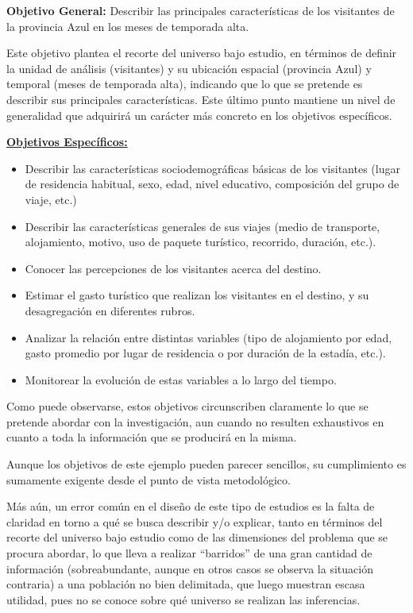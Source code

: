 \documentclass[
]{book}
\begin{document}
\textbf{Objetivo General:} Describir las principales características de los visitantes de la provincia Azul en los meses de temporada alta.

Este objetivo plantea el recorte del universo bajo estudio, en términos de definir la unidad de análisis (visitantes) y su ubicación espacial (provincia Azul) y temporal (meses de temporada alta), indicando que lo que se pretende es describir sus principales características. Este último punto mantiene un nivel de generalidad que adquirirá un carácter más concreto en los objetivos específicos.

\underline{\textbf{Objetivos Específicos:}}

\begin{itemize}
\item
  Describir las características sociodemográficas básicas de los visitantes (lugar de residencia habitual, sexo, edad, nivel educativo, composición del grupo de viaje, etc.)
\item
  Describir las características generales de sus viajes (medio de transporte, alojamiento, motivo, uso de paquete turístico, recorrido, duración, etc.).
\item
  Conocer las percepciones de los visitantes acerca del destino.
\item
  Estimar el gasto turístico que realizan los visitantes en el destino, y su desagregación en diferentes rubros.
\item
  Analizar la relación entre distintas variables (tipo de alojamiento por edad, gasto promedio por lugar de residencia o por duración de la estadía, etc.).
\item
  Monitorear la evolución de estas variables a lo largo del tiempo.
\end{itemize}

Como puede observarse, estos objetivos circunscriben claramente lo que se pretende abordar con la investigación, aun cuando no resulten exhaustivos en cuanto a toda la información que se producirá en la misma.

Aunque los objetivos de este ejemplo pueden parecer sencillos, su cumplimiento es sumamente exigente desde el punto de vista metodológico.

Más aún, un error común en el diseño de este tipo de estudios es la falta de claridad en torno a qué se busca describir y/o explicar, tanto en términos del recorte del universo bajo estudio como de las dimensiones del problema que se procura abordar, lo que lleva a realizar ``barridos'' de una gran cantidad de información (sobreabundante, aunque en otros casos se observa la situación contraria) a una población no bien delimitada, que luego muestran escasa utilidad, pues no se conoce sobre qué universo se realizan las inferencias.
\end{document}
